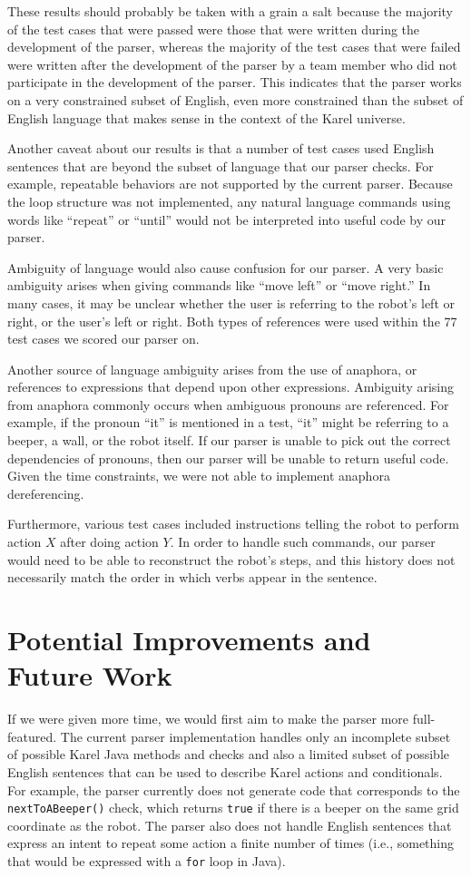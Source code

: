\documentclass[11pt]{article}
\begin{document}
These results should probably be taken with a grain a salt because the majority of the
test cases that were passed were those that were written during the development of the parser,
whereas the majority of the test cases that were failed were written after the development of the
parser by a team member who did not participate in the development of the parser. This indicates
that the parser works on a very constrained subset of English, even more constrained than the
subset of English language that makes sense in the context of the Karel universe.

Another caveat about our results is that a number of test cases used English sentences that are
beyond the subset of language that our parser checks.  For example, repeatable behaviors are not
supported by the current parser.  Because the loop structure was not implemented, any natural
language commands using words like ``repeat'' or ``until'' would not be interpreted into useful
code by our parser.

Ambiguity of language would also cause confusion for our parser.  A very basic ambiguity arises
when giving commands like ``move left'' or ``move right.''  In many cases, it may be unclear
whether the user is referring to the robot's left or right, or the user's left or right.  Both
types of references were used within the 77 test cases we scored our parser on.

Another source of language ambiguity arises from the use of anaphora, or references to expressions
that depend upon other expressions. Ambiguity arising from anaphora commonly occurs when ambiguous
pronouns are referenced.  For example, if the pronoun ``it'' is mentioned in a test, ``it'' might
be referring to a beeper, a wall, or the robot itself.  If our parser is unable to pick out the
correct dependencies of pronouns, then our parser will be unable to return useful code. Given the
time constraints, we were not able to implement anaphora dereferencing.

Furthermore, various test cases included instructions telling the robot to perform action $X$ after
doing action $Y$.  In order to handle such commands, our parser would need to be able to
reconstruct the robot's steps, and this history does not necessarily match the order in which verbs
appear in the sentence.

\section{Potential Improvements and Future Work}
If we were given more time, we would first aim to make the parser more full-featured. The current
parser implementation handles only an incomplete subset of possible Karel Java methods and checks
and also a limited subset of possible English sentences that can be used to describe Karel actions
and conditionals. For example, the parser currently does not generate code that corresponds to the
\texttt{nextToABeeper()} check, which returns \texttt{true} if there is a beeper on the same grid
coordinate as the robot. The parser also does not handle English sentences that express an intent
to repeat some action a finite number of times (i.e., something that would be expressed with a
\texttt{for} loop in Java).
\end{document}
